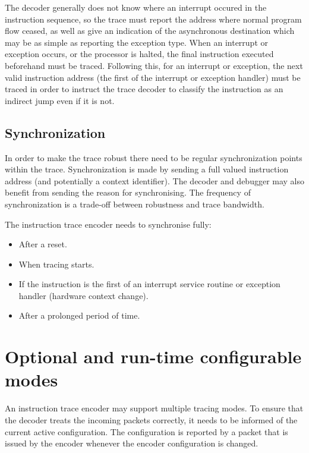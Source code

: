 The decoder generally does not know
where an interrupt occured in the instruction sequence, so the trace
must report the address where normal program flow ceased, as well as
give an indication of the asynchronous destination which may be as
simple as reporting the exception type.  When an interrupt or
exception occurs, or the processor is halted, the final instruction
executed beforehand must be traced.  Following this, for an interrupt
or exception, the next valid instruction address (the first of the
interrupt or exception handler) must be traced in order to instruct the
trace decoder to classify the instruction as an indirect jump even
if it is not.

\subsection{Synchronization} \label{synchronization}

In order to make the trace robust there need to be regular
synchronization points within the trace. Synchronization is made by
sending a full valued instruction address (and potentially a context
identifier). The decoder and debugger may also benefit from sending
the reason for synchronising. The frequency of synchronization is a
trade-off between robustness and trace bandwidth.

The instruction trace encoder needs to synchronise fully:

\begin{itemize}

\item After a reset.
  \item When tracing starts.
\item If the instruction is the first of an interrupt service routine or
exception handler (hardware context change).
\item After a prolonged period of time.
\end{itemize}

\section{Optional and run-time configurable modes} \label{optional}

An instruction trace encoder may support multiple tracing modes.
To ensure that the decoder treats the incoming packets
correctly, it needs to be informed of the current active configuration.
The configuration is reported by a packet that is issued by the encoder
whenever the encoder configuration is changed.

